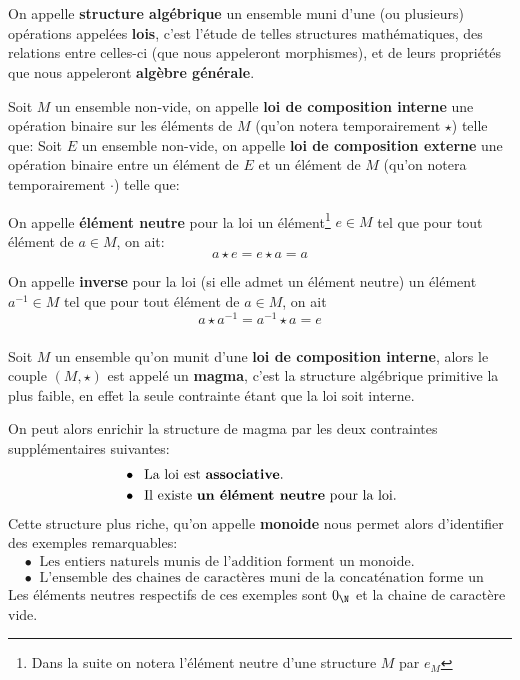 \chapter*{}

On appelle \textbf{structure algébrique} un ensemble muni d'une (ou plusieurs) opérations appelées \textbf{lois}, c'est l'étude de telles structures mathématiques, des relations entre celles-ci (que nous appeleront morphismes), et de leurs propriétés que nous appeleront \textbf{algèbre générale}.\<

Soit \(M\) un ensemble non-vide, on appelle \textbf{loi de composition interne} une opération binaire sur les éléments de \(M\) (qu'on notera temporairement \(\star\)) telle que:
Soit \(E\) un ensemble non-vide, on appelle \textbf{loi de composition externe} une opération binaire entre un élément de \(E\) et un élément de \(M\) (qu'on notera temporairement \(\cdot\)) telle que:

On appelle \textbf{élément neutre} pour la loi un élément\footnote[1]{Dans la suite on notera l'élément neutre d'une structure \(M\) par \(e_M\)} \(e \in M\) tel que pour tout élément de \(a \in M\), on ait:
\[a \star e = e \star a = a\]

On appelle \textbf{inverse} pour la loi (si elle admet un élément neutre) un élément \(a^{-1} \in M\) tel que pour tout élément de \(a \in M\), on ait 
\[a \star a^{-1} = a^{-1} \star a = e\]

\subsection*{}
Soit \(M\) un ensemble qu'on munit d'une \textbf{loi de composition interne}, alors le couple \((M, \star)\) est appelé un \textbf{magma}, c'est la structure algébrique primitive la plus faible, en effet la seule contrainte étant que la loi soit interne.\<

On peut alors enrichir la structure de magma par les deux contraintes supplémentaires suivantes:
\begin{align*}
   &\bullet \;\; \text{La loi est \textbf{associative}.}\\
   &\bullet \;\; \text{Il existe \textbf{un élément neutre} pour la loi.}
\end{align*}
Cette structure plus riche, qu'on appelle \textbf{monoide} nous permet alors d'identifier des exemples remarquables:
\begin{align*}
   &\bullet \;\; \text{Les entiers naturels munis de l'addition forment un monoide.}\\
   &\bullet \;\; \text{L'ensemble des chaines de caractères muni de la concaténation forme un monoide.}
\end{align*}
Les éléments neutres respectifs de ces exemples sont \(0_\N\) et la chaine de caractère vide.
